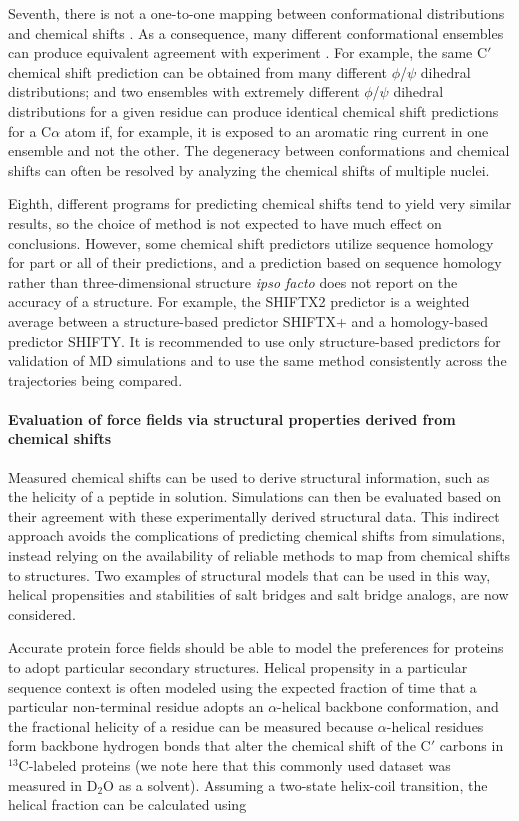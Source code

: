 \documentclass[9pt,review]{livecoms}
\begin{document}
Seventh, there is not a one-to-one mapping between conformational distributions and chemical shifts \cite{ozenne2012mapping}. As a consequence, many different conformational ensembles can produce equivalent agreement with experiment \cite{wood_secondary_2011,virtanen_heterogeneous_2020,shrestha_full_2021}.
For example, the same C$'$ chemical shift prediction can be obtained from many different $\phi$/$\psi$ dihedral distributions; and two ensembles with extremely different $\phi$/$\psi$ dihedral distributions for a given residue can produce identical chemical shift predictions for a C$\alpha$ atom if, for example, it is exposed to an aromatic ring current in one ensemble and not the other.
The degeneracy between conformations and chemical shifts can often be resolved by analyzing the chemical shifts of multiple nuclei.

Eighth, different programs for predicting chemical shifts tend to yield very similar results, so the choice of method is not expected to have much effect on conclusions.
However, some chemical shift predictors utilize sequence homology for part or all of their predictions, and a prediction based on sequence homology rather than three-dimensional structure \emph{ipso facto} does not report on the accuracy of a structure.
For example, the SHIFTX2 predictor is a weighted average between a structure-based predictor SHIFTX+ and a homology-based predictor SHIFTY.
It is recommended to use only structure-based predictors for validation of MD simulations and to use the same method consistently across the trajectories being compared.

\paragraph{Evaluation of force fields via structural properties derived from chemical shifts}

Measured chemical shifts can be used to derive structural information, such as the helicity of a peptide in solution.
Simulations can then be evaluated based on their agreement with these experimentally derived structural data.
This indirect approach avoids the complications of predicting chemical shifts from simulations, instead relying on the availability of reliable methods to map from chemical shifts to structures.
Two examples of structural models that can be used in this way, helical propensities and stabilities of salt bridges and salt bridge analogs, are now considered.

Accurate protein force fields should be able to model the preferences for proteins to adopt particular secondary structures.
Helical propensity in a particular sequence context is often modeled using the expected fraction of time that a particular non-terminal residue adopts an $\alpha$-helical backbone conformation, and the fractional helicity of a residue can be measured because $\alpha$-helical residues form backbone hydrogen bonds that alter the chemical shift of the C$'$ carbons in $^{13}$C-labeled proteins \cite{shalongo_distribution_1994} (we note here that this commonly used dataset was measured in $\text{D}_2\text{O}$ as a solvent).
Assuming a two-state helix-coil transition, the helical fraction can be calculated using
\end{document}
